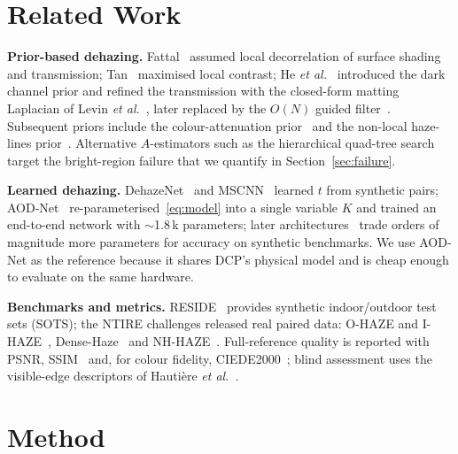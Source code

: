 \documentclass[conference]{IEEEtran}
\begin{document}
\section{Related Work}
\textbf{Prior-based dehazing.} Fattal~\cite{fattal2008} assumed local decorrelation of surface shading and transmission;
Tan~\cite{tan2008} maximised local contrast; He \emph{et al.}~\cite{he2009,he2011} introduced the dark channel prior and
refined the transmission with the closed-form matting Laplacian of Levin \emph{et al.}~\cite{levin2008}, later replaced by
the $O(N)$ guided filter~\cite{he2010}. Subsequent priors include the colour-attenuation prior~\cite{zhu2015} and the
non-local haze-lines prior~\cite{berman2016}. Alternative $A$-estimators such as the hierarchical quad-tree
search~\cite{kim2013} target the bright-region failure that we quantify in Section~\ref{sec:failure}.

\textbf{Learned dehazing.} DehazeNet~\cite{cai2016} and MSCNN~\cite{ren2016} learned $t$ from synthetic pairs;
AOD-Net~\cite{li2017} re-parameterised~\eqref{eq:model} into a single variable $K$ and trained an end-to-end network with
$\sim$1.8\,k parameters; later architectures~\cite{qin2020,song2023} trade orders of magnitude more parameters for
accuracy on synthetic benchmarks. We use AOD-Net as the reference because it shares DCP's physical model and is cheap
enough to evaluate on the same hardware.

\textbf{Benchmarks and metrics.} RESIDE~\cite{li2019} provides synthetic indoor/outdoor test sets (SOTS); the NTIRE
challenges released real paired data: O-HAZE and I-HAZE~\cite{ancuti2018o,ancuti2018i}, Dense-Haze~\cite{ancuti2019}
and NH-HAZE~\cite{ancuti2020}. Full-reference quality is reported with PSNR, SSIM~\cite{wang2004} and, for colour
fidelity, CIEDE2000~\cite{sharma2005}; blind assessment uses the visible-edge descriptors of Hautière
\emph{et al.}~\cite{hautiere2008}.

\section{Method}
\end{document}
